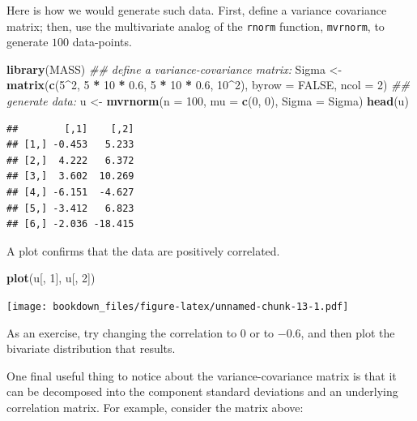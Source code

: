 \documentclass[12pt,]{krantz}
\newenvironment{Shaded}{\begin{snugshade}}{\end{snugshade}}
\newcommand{\CommentTok}[1]{\textcolor[rgb]{0.56,0.35,0.01}{\textit{#1}}}
\newcommand{\DataTypeTok}[1]{\textcolor[rgb]{0.13,0.29,0.53}{#1}}
\newcommand{\DecValTok}[1]{\textcolor[rgb]{0.00,0.00,0.81}{#1}}
\newcommand{\FloatTok}[1]{\textcolor[rgb]{0.00,0.00,0.81}{#1}}
\newcommand{\KeywordTok}[1]{\textcolor[rgb]{0.13,0.29,0.53}{\textbf{#1}}}
\newcommand{\NormalTok}[1]{#1}
\newcommand{\OperatorTok}[1]{\textcolor[rgb]{0.81,0.36,0.00}{\textbf{#1}}}
\newcommand{\OtherTok}[1]{\textcolor[rgb]{0.56,0.35,0.01}{#1}}
\newcommand{\StringTok}[1]{\textcolor[rgb]{0.31,0.60,0.02}{#1}}
\begin{document}
Here is how we would generate such data. First, define a variance covariance matrix; then, use the multivariate analog of the \texttt{rnorm} function, \texttt{mvrnorm}, to generate \(100\) data-points.

\begin{Shaded}
\begin{Highlighting}[]
\KeywordTok{library}\NormalTok{(MASS)}
\CommentTok{## define a variance-covariance matrix:}
\NormalTok{Sigma <-}\StringTok{ }\KeywordTok{matrix}\NormalTok{(}\KeywordTok{c}\NormalTok{(}\DecValTok{5}\OperatorTok{^}\DecValTok{2}\NormalTok{, }\DecValTok{5} \OperatorTok{*}\StringTok{ }\DecValTok{10} \OperatorTok{*}\StringTok{ }\FloatTok{0.6}\NormalTok{, }\DecValTok{5} \OperatorTok{*}\StringTok{ }
\StringTok{  }\DecValTok{10} \OperatorTok{*}\StringTok{ }\FloatTok{0.6}\NormalTok{, }\DecValTok{10}\OperatorTok{^}\DecValTok{2}\NormalTok{), }\DataTypeTok{byrow =} \OtherTok{FALSE}\NormalTok{, }\DataTypeTok{ncol =} \DecValTok{2}\NormalTok{)}
\CommentTok{## generate data:}
\NormalTok{u <-}\StringTok{ }\KeywordTok{mvrnorm}\NormalTok{(}\DataTypeTok{n =} \DecValTok{100}\NormalTok{, }\DataTypeTok{mu =} \KeywordTok{c}\NormalTok{(}\DecValTok{0}\NormalTok{, }\DecValTok{0}\NormalTok{), }\DataTypeTok{Sigma =}\NormalTok{ Sigma)}
\KeywordTok{head}\NormalTok{(u)}
\end{Highlighting}
\end{Shaded}

\begin{verbatim}
##        [,1]    [,2]
## [1,] -0.453   5.233
## [2,]  4.222   6.372
## [3,]  3.602  10.269
## [4,] -6.151  -4.627
## [5,] -3.412   6.823
## [6,] -2.036 -18.415
\end{verbatim}

A plot confirms that the data are positively correlated.

\begin{Shaded}
\begin{Highlighting}[]
\KeywordTok{plot}\NormalTok{(u[, }\DecValTok{1}\NormalTok{], u[, }\DecValTok{2}\NormalTok{])}
\end{Highlighting}
\end{Shaded}

\texttt{[image: bookdown\_files/figure-latex/unnamed-chunk-13-1.pdf]}

As an exercise, try changing the correlation to \(0\) or to \(-0.6\), and then plot the bivariate distribution that results.

One final useful thing to notice about the variance-covariance matrix is that it can be decomposed into the component standard deviations and an underlying correlation matrix. For example, consider the matrix above:
\end{document}
